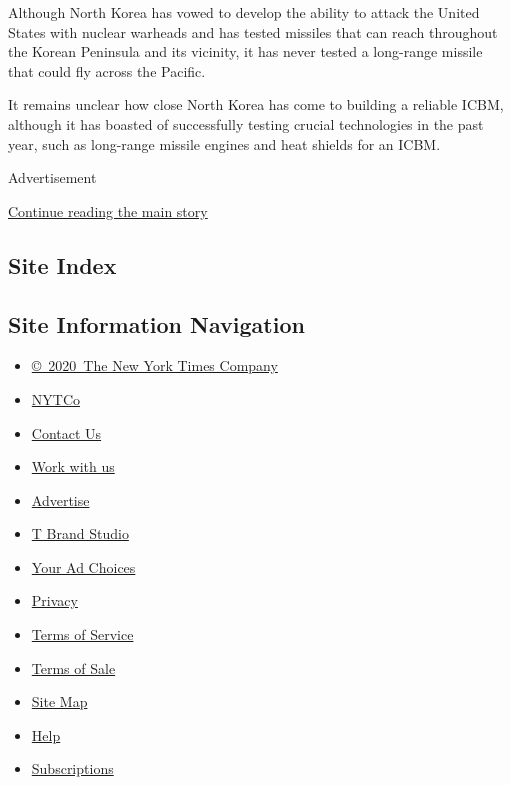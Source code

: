 Although North Korea has vowed to develop the ability to attack the
United States with nuclear warheads and has tested missiles that can
reach throughout the Korean Peninsula and its vicinity, it has never
tested a long-range missile that could fly across the Pacific.

It remains unclear how close North Korea has come to building a reliable
ICBM, although it has boasted of successfully testing crucial
technologies in the past year, such as long-range missile engines and
heat shields for an ICBM.

Advertisement

\protect\hyperlink{after-bottom}{Continue reading the main story}

\hypertarget{site-index}{%
\subsection{Site Index}\label{site-index}}

\hypertarget{site-information-navigation}{%
\subsection{Site Information
Navigation}\label{site-information-navigation}}

\begin{itemize}
\tightlist
\item
  \href{https://help.nytimes.com/hc/en-us/articles/115014792127-Copyright-notice}{©~2020~The
  New York Times Company}
\end{itemize}

\begin{itemize}
\tightlist
\item
  \href{https://www.nytco.com/}{NYTCo}
\item
  \href{https://help.nytimes.com/hc/en-us/articles/115015385887-Contact-Us}{Contact
  Us}
\item
  \href{https://www.nytco.com/careers/}{Work with us}
\item
  \href{https://nytmediakit.com/}{Advertise}
\item
  \href{http://www.tbrandstudio.com/}{T Brand Studio}
\item
  \href{https://www.nytimes.com/privacy/cookie-policy\#how-do-i-manage-trackers}{Your
  Ad Choices}
\item
  \href{https://www.nytimes.com/privacy}{Privacy}
\item
  \href{https://help.nytimes.com/hc/en-us/articles/115014893428-Terms-of-service}{Terms
  of Service}
\item
  \href{https://help.nytimes.com/hc/en-us/articles/115014893968-Terms-of-sale}{Terms
  of Sale}
\item
  \href{https://spiderbites.nytimes.com}{Site Map}
\item
  \href{https://help.nytimes.com/hc/en-us}{Help}
\item
  \href{https://www.nytimes.com/subscription?campaignId=37WXW}{Subscriptions}
\end{itemize}
